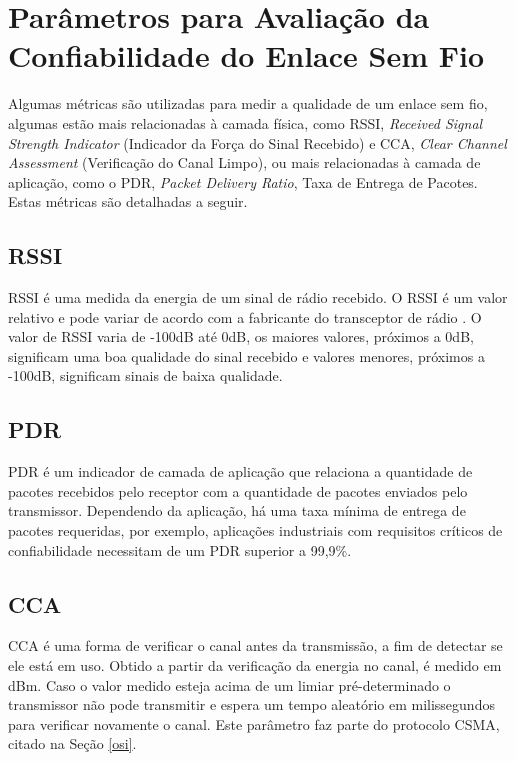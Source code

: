 \section{Parâmetros para Avaliação da Confiabilidade do Enlace Sem Fio}
\label{paramSF}
Algumas métricas são utilizadas para medir a qualidade de um enlace sem fio, algumas estão mais relacionadas à camada física, como RSSI, \emph{Received Signal Strength Indicator} (Indicador da Força do Sinal Recebido) e CCA, \emph{Clear Channel Assessment} (Verificação do Canal Limpo), ou mais relacionadas à camada de aplicação, como o PDR, \emph{Packet Delivery Ratio}, Taxa de Entrega de Pacotes. Estas métricas são detalhadas a seguir.

\subsection{RSSI}
RSSI é uma medida da energia de um sinal de rádio recebido. O RSSI é um valor relativo e pode variar de acordo com a fabricante do transceptor de rádio \cite{UNDERSTANDING_RSSI}. O valor de RSSI varia de -100dB até 0dB, os maiores valores, próximos a 0dB, significam uma boa qualidade do sinal recebido e valores menores, próximos a -100dB, significam sinais de baixa qualidade.

\subsection{PDR}
PDR é um indicador de camada de aplicação que relaciona a quantidade de pacotes recebidos pelo receptor com a quantidade de pacotes enviados pelo transmissor. Dependendo da aplicação, há uma taxa mínima de entrega de pacotes requeridas, por exemplo, aplicações industriais com requisitos críticos de confiabilidade necessitam de um PDR superior a 99,9\%.

\subsection{CCA}
CCA é uma forma de verificar o canal antes da transmissão, a fim de detectar se ele está em uso. Obtido a partir da verificação da energia no canal, é medido em dBm. Caso o valor medido esteja acima de um limiar pré-determinado o transmissor não pode transmitir e espera um tempo aleatório em milissegundos para verificar novamente o canal. Este parâmetro faz parte do protocolo CSMA, citado na Seção \ref{osi}.

